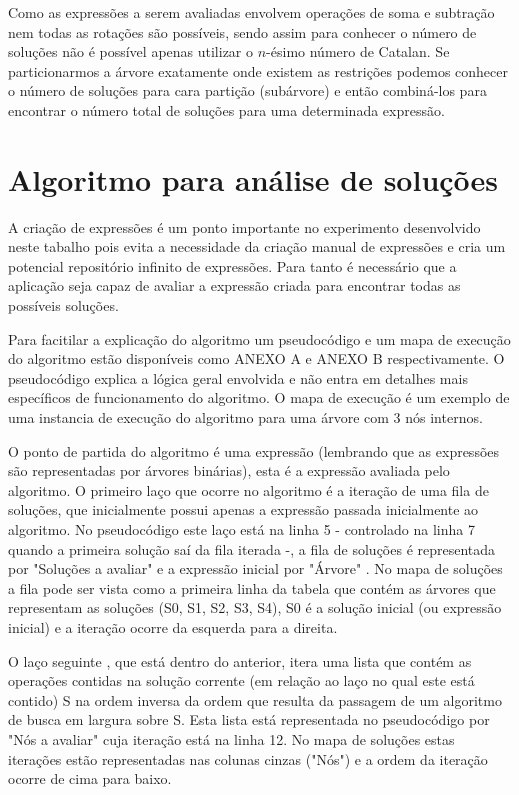 Como as expressões a serem avaliadas envolvem operações de soma e subtração nem todas as rotações são possíveis, sendo assim para conhecer o número de soluções não é possível apenas utilizar o $n$-ésimo número de Catalan. Se particionarmos a árvore exatamente onde existem as restrições podemos conhecer o número de soluções para cara partição (subárvore) e então combiná-los para encontrar o número total de soluções para uma determinada expressão.
	
\section{Algoritmo para análise de soluções}
A criação de expressões é um ponto importante no experimento desenvolvido neste tabalho pois evita a necessidade da criação manual de expressões e cria um potencial repositório infinito de expressões. Para tanto é necessário que a aplicação seja capaz de avaliar a expressão criada para encontrar todas as possíveis soluções.

  Para facitilar a explicação do algoritmo um pseudocódigo e um mapa de execução do algoritmo estão disponíveis como ANEXO A e ANEXO B respectivamente. O pseudocódigo explica a lógica geral envolvida e não entra em detalhes mais específicos de funcionamento do algoritmo. O mapa de execução é um exemplo de uma instancia de execução do algoritmo para uma árvore com 3 nós internos.

O ponto de partida do algoritmo é uma expressão (lembrando que as expressões são representadas por árvores binárias), esta é a expressão avaliada pelo algoritmo. O primeiro laço que ocorre no algoritmo é a iteração de uma fila de soluções, que inicialmente possui apenas a expressão passada inicialmente ao algoritmo. No pseudocódigo este laço está na linha 5 - controlado na linha 7 quando a primeira solução saí da fila iterada -, a fila de soluções é representada por "Soluções a avaliar" e a expressão inicial por "Árvore" . No mapa de soluções a fila pode ser vista como a primeira linha da tabela que contém as árvores que representam as soluções (S0, S1, S2, S3, S4), S0 é a solução inicial (ou expressão inicial) e a iteração ocorre da esquerda para a direita.

O laço seguinte , que está dentro do anterior, itera uma lista que contém as operações contidas na solução corrente (em relação ao laço no qual este está contido) S na ordem inversa da ordem que resulta da passagem de um algoritmo de busca em largura sobre S. Esta lista está representada no pseudocódigo por "Nós a avaliar" cuja iteração está na linha 12. No mapa de soluções estas iterações estão representadas nas colunas cinzas ("Nós") e a ordem da iteração ocorre de cima para baixo.

